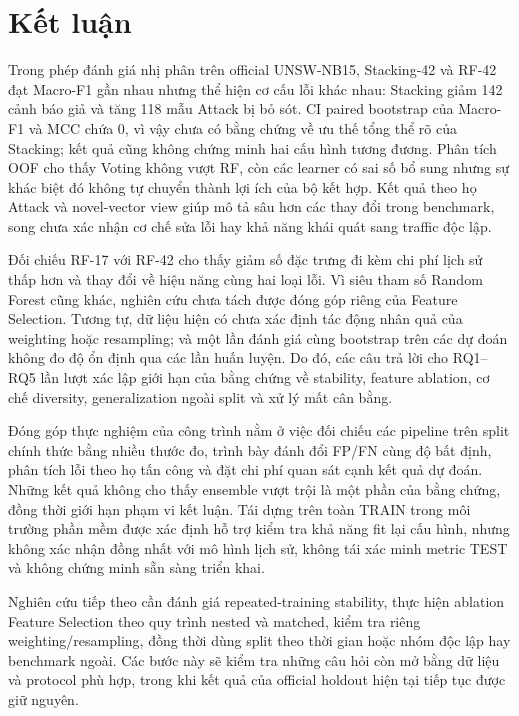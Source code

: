 \section{Kết luận}
\label{chap:ket-luan}

Trong phép đánh giá nhị phân trên official UNSW-NB15, Stacking-42 và RF-42 đạt Macro-F1 gần nhau nhưng thể hiện cơ cấu lỗi khác nhau: Stacking giảm 142 cảnh báo giả và tăng 118 mẫu Attack bị bỏ sót. CI paired bootstrap của Macro-F1 và MCC chứa 0, vì vậy chưa có bằng chứng về ưu thế tổng thể rõ của Stacking; kết quả cũng không chứng minh hai cấu hình tương đương. Phân tích OOF cho thấy Voting không vượt RF, còn các learner có sai số bổ sung nhưng sự khác biệt đó không tự chuyển thành lợi ích của bộ kết hợp. Kết quả theo họ Attack và novel-vector view giúp mô tả sâu hơn các thay đổi trong benchmark, song chưa xác nhận cơ chế sửa lỗi hay khả năng khái quát sang traffic độc lập.

Đối chiếu RF-17 với RF-42 cho thấy giảm số đặc trưng đi kèm chi phí lịch sử thấp hơn và thay đổi về hiệu năng cùng hai loại lỗi. Vì siêu tham số Random Forest cũng khác, nghiên cứu chưa tách được đóng góp riêng của Feature Selection. Tương tự, dữ liệu hiện có chưa xác định tác động nhân quả của weighting hoặc resampling; và một lần đánh giá cùng bootstrap trên các dự đoán không đo độ ổn định qua các lần huấn luyện. Do đó, các câu trả lời cho RQ1--RQ5 lần lượt xác lập giới hạn của bằng chứng về stability, feature ablation, cơ chế diversity, generalization ngoài split và xử lý mất cân bằng.

Đóng góp thực nghiệm của công trình nằm ở việc đối chiếu các pipeline trên split chính thức bằng nhiều thước đo, trình bày đánh đổi FP/FN cùng độ bất định, phân tích lỗi theo họ tấn công và đặt chi phí quan sát cạnh kết quả dự đoán. Những kết quả không cho thấy ensemble vượt trội là một phần của bằng chứng, đồng thời giới hạn phạm vi kết luận. Tái dựng trên toàn TRAIN trong môi trường phần mềm được xác định hỗ trợ kiểm tra khả năng fit lại cấu hình, nhưng không xác nhận đồng nhất với mô hình lịch sử, không tái xác minh metric TEST và không chứng minh sẵn sàng triển khai.

Nghiên cứu tiếp theo cần đánh giá repeated-training stability, thực hiện ablation Feature Selection theo quy trình nested và matched, kiểm tra riêng weighting/resampling, đồng thời dùng split theo thời gian hoặc nhóm độc lập hay benchmark ngoài. Các bước này sẽ kiểm tra những câu hỏi còn mở bằng dữ liệu và protocol phù hợp, trong khi kết quả của official holdout hiện tại tiếp tục được giữ nguyên.
